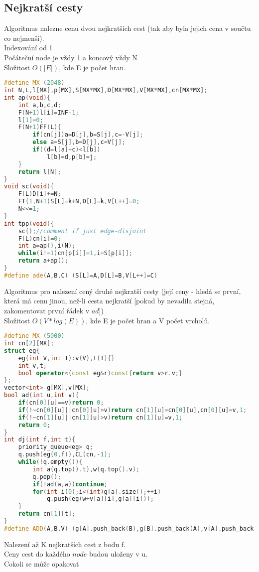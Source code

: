 \documentclass[11pt]{article}
\begin{document}
\subsection{Nejkratší cesty}
Algoritmus nalezne cenu dvou nejkratších cest (tak aby byla jejich cena v součtu co nejmenší).
\\Indexování od 1
\\Počáteční node je vždy 1 a koncový vždy \textsf{N}
\\Složitost $O(|E|)$, kde \textsf{E} je počet hran.
\begin{lstlisting}[language=C++]
#define MX (2048)
int N,L,l[MX],p[MX],S[MX*MX],D[MX*MX],V[MX*MX],cn[MX*MX];
int ap(void){
    int a,b,c,d;
    F(N+1)l[i]=INF-1;
    l[1]=0;
    F(N+1)FF(L){
        if(cn[j])a=D[j],b=S[j],c=-V[j];
        else a=S[j],b=D[j],c=V[j];
        if((d=l[a]+c)<l[b])
            l[b]=d,p[b]=j;
    }
    return l[N];
}
void sc(void){
    F(L)D[i]+=N;
    FT(1,N+1)S[L]=k+N,D[L]=k,V[L++]=0;
    N<<=1;
}
int tpp(void){
    sc();//comment if just edge-disjoint
    F(L)cn[i]=0;
    int a=ap(),i(N);
    while(i!=1)cn[p[i]]=1,i=S[p[i]];
    return a+ap();
}
#define ade(A,B,C) (S[L]=A,D[L]=B,V[L++]=C)
\end{lstlisting}
Algoritmus pro nalezení cený druhé nejkratší cesty (její ceny - hledá se první, která má cenu jinou, než-li cesta nejkratší [pokud by nevadila stejná, zakomentovat první řádek v $ad$])
\\Složitost $O(V*log(E))$, kde \textsf{E} je počet hran a \textsf{V} počet vrcholů.
\begin{lstlisting}[language=C++]
#define MX (5000)
int cn[2][MX];
struct eg{
    eg(int V,int T):v(V),t(T){}
    int v,t;
    bool operator<(const eg&r)const{return v>r.v;}
};
vector<int> g[MX],v[MX];
bool ad(int u,int v){
    if(cn[0][u]==v)return 0;
    if(!~cn[0][u]||cn[0][u]>v)return cn[1][u]=cn[0][u],cn[0][u]=v,1;
    if(!~cn[1][u]||cn[1][u]>v)return cn[1][u]=v,1;
    return 0;
}
int dj(int f,int t){
    priority_queue<eg> q;
    q.push(eg(0,f)),CL(cn,-1);
    while(!q.empty()){
        int a(q.top().t),w(q.top().v);
        q.pop();
        if(!ad(a,w))continue;
        for(int i(0);i<(int)g[a].size();++i)
            q.push(eg(w+v[a][i],g[a][i]));
    }
    return cn[1][t];
}
#define ADD(A,B,V) (g[A].push_back(B),g[B].push_back(A),v[A].push_back(V),v[B].push_back(V))
\end{lstlisting}
Nalezení až \textsf{K} nejkratších cest z bodu \textsf{f}. 
\\Ceny cest do každého $node$ budou uloženy v \textsf{u}.
\\Cokoli se může opakovat
\end{document}
